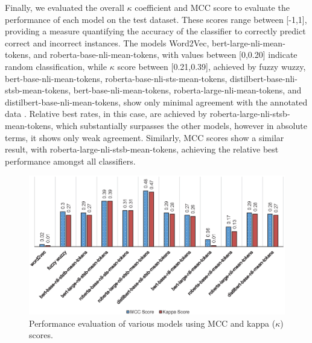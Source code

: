\documentclass{ieeeaccess}
\begin{document}
Finally, we evaluated the overall $\kappa$ coefficient and MCC score to evaluate the performance of each model on the test dataset. These scores range between [-1,1], providing a measure quantifying the accuracy of the classifier to correctly predict correct and incorrect instances. The models Word2Vec, bert-large-nli-mean-tokens, and roberta-base-nli-mean-tokens, with values between [0,0.20] indicate random classification, while $\kappa$ score between [0.21,0.39], achieved by fuzzy wuzzy, bert-base-nli-mean-tokens, roberta-base-nli-sts-mean-tokens, distilbert-base-nli-stsb-mean-tokens, bert-base-nli-mean-tokens, roberta-large-nli-mean-tokens, and distilbert-base-nli-mean-tokens, show only minimal agreement with the annotated data \cite{mchugh2012interrater}.  Relative best rates, in this case, are achieved by roberta-large-nli-stsb-mean-tokens, which substantially surpasses the other models, however in absolute terms, it shows only weak agreement. Similarly, MCC scores show a similar result, with roberta-large-nli-stsb-mean-tokens, achieving the relative best performance amongst all classifiers.

\begin{figure}[t!]
	\centering
	\includegraphics[scale=0.83]{evaluation}
	\caption{Performance evaluation of various models using MCC and kappa ($\kappa$) scores.}
	\label{fig:evaluation}
\end{figure}
\end{document}
